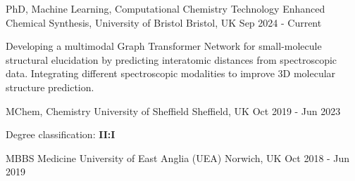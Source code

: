 \vspace{3mm}
\begin{cventries}
  \cventry
    {PhD, Machine Learning, Computational Chemistry}
    {Technology Enhanced Chemical Synthesis, University of Bristol}
    {Bristol, UK}
    {Sep 2024 - Current}
    {
    \begin{cvitems}
        \item {Developing a multimodal Graph Transformer Network for small-molecule structural elucidation by predicting interatomic distances from spectroscopic data. Integrating different spectroscopic modalities to improve 3D molecular structure prediction.}
      \end{cvitems}
    }

  \cventry
    {MChem, Chemistry}
    {University of Sheffield}
    {Sheffield, UK}
    {Oct 2019 - Jun 2023}
    {
      \begin{cvitems}
        \item {Degree classification: \textbf{II:I}}
      \end{cvitems}
    }
    
    \cventry
    {MBBS Medicine}
    {University of East Anglia (UEA)}
    {Norwich, UK}
    {Oct 2018 - Jun 2019}
    {}
\end{cventries}